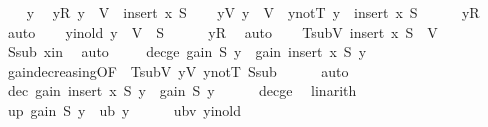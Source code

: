 \begin{isabellebody}
\ \ \isamarkupfalse%
\ y\ \isamarkupfalse%
\ yR{\isacharcolon}{\kern0pt}\ {\isachardoublequoteopen}y\ {\isasymin}\ V\ {\isacharminus}{\kern0pt}\ insert\ x\ S{\isachardoublequoteclose}\isanewline
\ \ \isamarkupfalse%
\ yV{\isacharcolon}{\kern0pt}\ {\isachardoublequoteopen}y\ {\isasymin}\ V{\isachardoublequoteclose}\ \ y{\isacharunderscore}{\kern0pt}notT{\isacharcolon}{\kern0pt}\ {\isachardoublequoteopen}y\ {\isasymnotin}\ insert\ x\ S{\isachardoublequoteclose}\isanewline
\ \ \ \ \isamarkupfalse%
\ yR\ \isamarkupfalse%
\ auto\isanewline
\isanewline
\ \ \isamarkupfalse%
\ y{\isacharunderscore}{\kern0pt}in{\isacharunderscore}{\kern0pt}old{\isacharcolon}{\kern0pt}\ {\isachardoublequoteopen}y\ {\isasymin}\ V\ {\isacharminus}{\kern0pt}\ S{\isachardoublequoteclose}\isanewline
\ \ \ \ \isamarkupfalse%
\ yR\ \isamarkupfalse%
\ auto\isanewline
\isanewline
\ \ \isamarkupfalse%
\ TsubV{\isacharcolon}{\kern0pt}\ {\isachardoublequoteopen}insert\ x\ S\ {\isasymsubseteq}\ V{\isachardoublequoteclose}\isanewline
\ \ \ \ \isamarkupfalse%
\ Ssub\ x{\isacharunderscore}{\kern0pt}in\ \isamarkupfalse%
\ auto\isanewline
\isanewline
\ \ \ \isamarkupfalse%
\ dec{\isacharunderscore}{\kern0pt}ge{\isacharcolon}{\kern0pt}\ {\isachardoublequoteopen}gain\ S\ y\ {\isasymge}\ gain\ {\isacharparenleft}{\kern0pt}insert\ x\ S{\isacharparenright}{\kern0pt}\ y{\isachardoublequoteclose}\isanewline
\ \ \ \ \isamarkupfalse%
\ gain{\isacharunderscore}{\kern0pt}decreasing{\isacharbrackleft}{\kern0pt}OF\ {\isacharunderscore}{\kern0pt}\ TsubV\ yV\ y{\isacharunderscore}{\kern0pt}notT{\isacharbrackright}{\kern0pt}\ Ssub\isanewline
\ \ \ \ \isamarkupfalse%
\ auto\isanewline
\isanewline
\ \ \isamarkupfalse%
\ dec{\isacharcolon}{\kern0pt}\ {\isachardoublequoteopen}gain\ {\isacharparenleft}{\kern0pt}insert\ x\ S{\isacharparenright}{\kern0pt}\ y\ {\isasymle}\ gain\ S\ y{\isachardoublequoteclose}\isanewline
\ \ \ \ \isamarkupfalse%
\ dec{\isacharunderscore}{\kern0pt}ge\ \isamarkupfalse%
\ linarith\isanewline
\isanewline
\ \ \isamarkupfalse%
\ up{\isacharcolon}{\kern0pt}\ {\isachardoublequoteopen}gain\ S\ y\ {\isasymle}\ ub\ y{\isachardoublequoteclose}\isanewline
\ \ \ \ \isamarkupfalse%
\ ubv\ y{\isacharunderscore}{\kern0pt}in{\isacharunderscore}{\kern0pt}old\ \isamarkupfalse%

\end{isabellebody}
